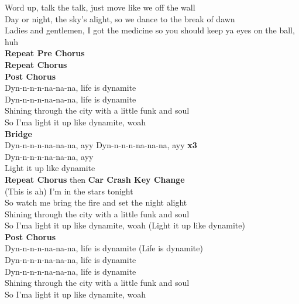 Word up, talk the talk, just move like we off the wall\\
Day or night, the sky's alight, so we dance to the break of dawn\\
Ladies and gentlemen, I got the medicine so you should keep ya eyes on the ball, huh\\
\textbf{Repeat Pre Chorus}\\
\textbf{Repeat Chorus}\\
\textbf{Post Chorus}\\
Dyn-n-n-n-na-na-na, life is dynamite\\
Dyn-n-n-n-na-na-na, life is dynamite\\
Shining through the city with a little funk and soul\\
So I'ma light it up like dynamite, woah\\
\textbf{Bridge}\\
Dyn-n-n-n-na-na-na, ayy Dyn-n-n-n-na-na-na, ayy  \textbf{x3}\\
Dyn-n-n-n-na-na-na, ayy\\
Light it up like dynamite\\
\textbf{Repeat Chorus} then \textbf{Car Crash Key Change}\\
(This is ah) I'm in the stars tonight \\
So watch me bring the fire and set the night alight\\
Shining through the city with a little funk and soul\\
So I'ma light it up like dynamite, woah (Light it up like dynamite)\\
\textbf{Post Chorus}\\
Dyn-n-n-n-na-na-na, life is dynamite (Life is dynamite)\\
Dyn-n-n-n-na-na-na, life is dynamite\\
Dyn-n-n-n-na-na-na, life is dynamite\\
Shining through the city with a little funk and soul\\
So I'ma light it up like dynamite, woah\\




